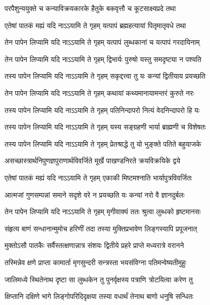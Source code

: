 \twolineshloka
{परपैशुन्ययुक्ते च कन्याविक्रयकारके}
{हैतुके बकवृत्तौ च कूटसाक्ष्यप्रदे तथा}%

\twolineshloka
{एतेषां पातकं मह्यं यदि नाऽऽयामि ते गृहम्}
{यत्पापं ब्रह्महत्यायां पितृमातृवधे तथा}%

\twolineshloka
{तेन पापेन लिप्यामि यदि नाऽऽयामि ते गृहम्}
{यत्पापं लुब्धकानां च यत्पापं गरदायिनाम्}%

\twolineshloka
{तेन पापेन लिप्यामि यदि नाऽऽयामि ते गृहम्}
{द्विभार्यः पुरुषो यस्तु समदृष्ट्या न पश्यति}%

\twolineshloka
{तस्य पापेन लिप्यामि यदि नाऽऽयामि ते गृहम्}
{सकृद्दत्त्वा तु यः कन्यां द्वितीयाय प्रयच्छति}%

\twolineshloka
{तेन पापेन लिप्यामि यदि नाऽऽयामि ते गृहम्}
{कथायां कथ्यमानायामन्तरं कुरुते नरः}%

\twolineshloka
{तस्य पापेन लिप्यामि यदि नाऽऽयामि ते गृहम्}
{पतिनिन्दापरो नित्यं वेदनिन्दापरो हि यः}%

\twolineshloka
{तस्य पापेन लिप्यामि यदि नाऽऽयामि ते गृहम्}
{यस्य सङ्ग्रहणी भार्या ब्राह्मणी च विशेषतः}%

\twolineshloka
{तस्य पापेन लिप्यामि यदि नाऽऽयामि ते गृहम्}
{प्रेतश्राद्धे तु यो भुङ्क्ते पतिते बहुयाजके}%

\twolineshloka
{असच्छास्त्रार्थनिपुणज्ञपुराणार्थविवर्जिते}
{मूर्खे पाखण्डनिरते क्रयविक्रयिके द्वये}%

\twolineshloka
{एतेषां पातकं मह्यं यदि नाऽऽयामि ते गृहम्}
{एकाकी मिष्टमश्नाति भार्यापुत्रविवर्जितः}%

\twolineshloka
{आत्मजां गुणसम्पन्नां समाने सदृशे वरे}
{न प्रयच्छति यः कन्यां नरो वै ज्ञानदुर्बलः}%

\twolineshloka
{तेन पापेन लिप्यामि यदि नाऽऽयामि ते गृहम्}
{मृगीवाक्यं ततः श्रुत्वा लुब्धको हृष्टमानसः}%

\twolineshloka
{संहृत्य बाणं सन्धानान्मुमोच हरिणीं तदा}
{तस्या मुक्तिप्रभावेण लिङ्गस्यापि प्रपूजनात्}%

\twolineshloka
{मुक्तोऽसौ पातकैः सर्वैस्तत्क्षणान्नात्र संशयः}
{द्वितीये प्रहरे प्राप्ते मध्यरात्रे वरानने}%

\twolineshloka
{तस्मिन्नेव क्षणे प्राप्ता कामार्ता मृगसुन्दरी}
{सन्त्रस्ता भयसंविग्ना पतिमन्वेष्यतीमुहुः}%

\twolineshloka
{जालिमध्ये स्थितेनाथ दृष्टा सा लुब्धकेन तु}
{पुनर्वृक्षस्य पत्राणि त्रोटयित्वा करेण तु}%

\twolineshloka
{क्षिप्तानि दक्षिणे भागे लिङ्गोपरिदिदृक्षया}
{तस्या वधार्थं तेनाथ बाणो धनुषि सन्धितः}%

